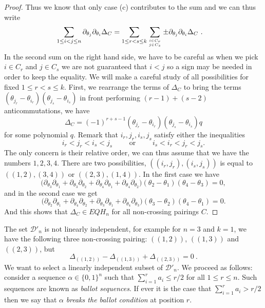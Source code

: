 \documentclass[11pt,oneside]{amsart}
\newcommand{\defncolor}{\color{darkred}}
\newcommand{\defn}[1]{{\defncolor\emph{#1}}} %
\theoremstyle{definition}
\numberwithin{equation}{section}
\begin{document}
\begin{proof}
Thus we know that only case (c) contributes to the sum and we can thus write
\begin{align*}
 \sum_{1\le i<j\le n} \partial_{\theta_j}\partial_{\theta_i}\Delta_C
 &= \sum_{1\le r<s\le k} \sum_{i\in C_{r} \atop j\in C_{s}} \pm  \partial_{\theta_j}\partial_{\theta_i}\Delta_C~.
\end{align*}
In the second sum on the right hand side, we have to be careful as when we pick
$i\in C_{r}$ and $ j\in C_{s}$ we are not guaranteed that $i<j$ so a sign may be needed
in  order to keep the equality. We will make a careful study of all possibilities
for fixed $1\le r<s\le k$. First, we rearrange the terms of $\Delta_C$ to  bring the terms
$(\theta_{j_{r}}-\theta_{i_{r}})(\theta_{j_{s}}-\theta_{i_{s}})$ in front  performing $(r-1)+(s-2)$ anticommutations, we have
  $$\Delta_C  =(-1)^{r+s-1}(\theta_{j_{r}}-\theta_{i_{r}})(\theta_{j_{s}}-\theta_{i_{s}})q$$
  for some polynomial $q$. Remark that $i_{r},j_{r},i_{s},j_{s}$ satisfy either the inequalities
  $$  i_r<j_r<i_s<j_s \qquad \text{ or }\qquad  i_s<i_r<j_r<j_s.$$
 The only concern is their relative order, we can thus assume that we have the numbers $1,2,3,4$.
  There are two possibilities, $((i_r,j_r), (i_s,j_s))$ is equal to $((1,2),(3,4))$ or $((2,3),(1,4))$.
  In the first case we have
$$ \big( \partial_{\theta_3}\partial_{\theta_1} +  \partial_{\theta_3}\partial_{\theta_2} +  \partial_{\theta_4}\partial_{\theta_1} +  \partial_{\theta_4}\partial_{\theta_2}\big)
     (\theta_{2}-\theta_{1})(\theta_{4}-\theta_{3}) =0,
$$
 and in the second case we get
$$ \big( \partial_{\theta_2}\partial_{\theta_1} +  \partial_{\theta_4}\partial_{\theta_2} +  \partial_{\theta_3}\partial_{\theta_1} +  \partial_{\theta_4}\partial_{\theta_3}\big)
     (\theta_{3}-\theta_{2})(\theta_{4}-\theta_{1}) =0.
$$
And this shows that $\Delta_C\in EQH_n $ for all non-crossing pairings $C$.
\end{proof}

The set ${\mathcal D}'_n$ is not linearly independent, for example for $n=3$ and $k=1$, we have the following three non-crossing pairing:
$((1,2))$, $((1,3))$ and $((2,3))$, but
\[
\Delta_{((1,2))} - \Delta_{((1,3))} + \Delta_{((2,3))} =0 ~.
\]
We want to select a linearly independent subset of ${\mathcal D}'_n$. We proceed as follows:
consider a sequence
$\alpha \in \{0, 1\}^n$ such that $\sum_{i=1}^r a_i \leq r/2$ for all $1 \leq r \leq n$.
Such sequences are known as \defn{ballot sequences}.
If ever it is the case that $\sum_{i=1}^r a_i > r/2$ then we say that
$\alpha$ \defn{breaks the ballot condition} at position $r$.
\end{document}
